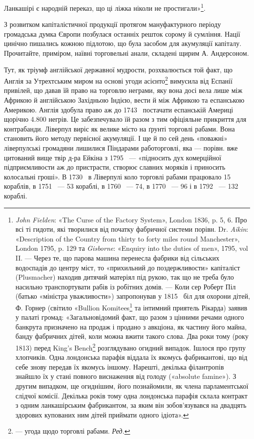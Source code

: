 Ланкашірі є народній переказ, що ці ліжка ніколи не простигали»\footnote{
\emph{John Fielden}: «The Curse of the Factory System», London 1836, p. 5, 6.
Про всі ті гидоти, які творилися від початку фабричної системи порівн.
Dr. \emph{Aikin}: «Description of the Country from thirty to forty miles round
Manchester», London 1795, p. 129 та \emph{Gisborne}: «Enquiry into the duties of
men», 1795, vol II. — Через те, що парова машина перенесла
фабрики від сільських водоспадів до центру міст, то «прихильний до поздержливости»
капіталіст (Plusmacher) находив дитячий матеріял під рукою, так що не треба було
насильно транспортувати рабів із робітних домів. — Коли сер Роберт Піл
(батько «міністра уважливости») запропонував у 1815~ біл
для охорони дітей, Ф. Горнер (світило «Bullion Komitees\footnote*{
— комітет у справах зливків. \emph{Ред.}
} та інтимний приятель Рікарда) заявив у палаті громад:
«Загальновідомий факт, що разом з цінними речами одного банкрута
призначено на продаж і продано з авкціона, як частину його майна, банду
фабричних дітей, коли можна вжити такого слова. Два роки тому (року
1813) перед King’s Bench\footnote*{
— найвищим судом. \emph{Ред.}
} розглядувано огидний випадок. Ішлося про
групу хлопчиків. Одна лондонська парафія віддала їх якомусь фабрикантові,
що від себе знову передав їх якомусь іншому. Нарешті, декілька філантропів
знайшло їх у стані повного виснаження від голоду («absolute
famine»). З другим випадком, ще огиднішим, його познайомили, як члена
парламентської слідчої комісії. Декілька років тому одна лондонська
парафія склала контракт з одним ланкашірським фабрикантом, за яким
він зобов’язувався на двадцять здорових купованих ним дітей приймати
одного ідіота».
}.

З розвитком капіталістичної продукції протягом мануфактурного
періоду громадська думка Європи позбулася останніх решток
сорому й сумління. Нації цинічно пишались кожною підлотою,
що була засобом для акумуляції капіталу. Прочитайте, приміром,
наївні торговельні анали, складені щирим А. Андерсоном.

Тут, як тріумф англійської державної мудрости, розхвалюється
той факт, що Англія за Утрехтським миром на основі
угоди асієнто\footnote*{
— угода щодо торговлі рабами. \emph{Ред.}
} вимусила від Еспанії привілей, що давав їй
право на торговлю неграми, яку вона досі вела лише між Африкою
й англійською Західньою Індією, вести й між Африкою та
еспанською Америкою. Англія здобула право аж до 1743~ постачати
еспанській Америці щорічно \num{4.800} негрів. Це забезпечувало
їй разом з тим офіціяльне прикриття для контрабанди.
Ліверпул виріс як велике місто на ґрунті торговлі рабами.
Вона становить його методу первісної акумуляції. І ще й по сей
день «поважні» ліверпулські громадяни лишилися Піндарами
работорговлі, яка — порівн. вже цитований вище твір д-ра Ейкіна
з 1795~ — «підносить дух комерційної підприємливости аж до
пристрасти, створює славних моряків і приносить колосальні
гроші». В 1730~ в Ліверпулі коло торговлі рабами працювало
15 кораблів, в 1751~ — 53 кораблі, в 1760~ — 74, в 1770~ —
96 і в 1792~ — 132 кораблі.

